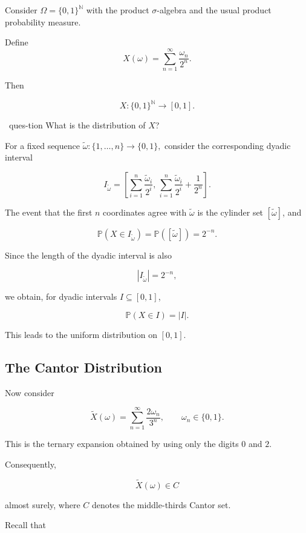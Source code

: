 Consider
\(
\Omega=\{0,1\}^{\mathbb{N}}
\)
with the product $\sigma$-algebra and the usual product probability
measure.

Define
\[
X(\omega)
=
\sum_{n=1}^{\infty}
\frac{\omega_n}{2^n}.
\]

Then

\[
X:\{0,1\}^{\mathbb{N}}\longrightarrow[0,1].
\]

\begin{question}{~}{ques-tion}
What is the distribution of $X$?
\end{question}

For a fixed sequence
\(
\widetilde{\omega}:
\{1,\ldots,n\}
\longrightarrow
\{0,1\},
\)
consider the corresponding dyadic interval

\[
I_{\widetilde{\omega}}
=
\left[
\sum_{i=1}^{n}
\frac{\widetilde{\omega}_i}{2^i},
\,
\sum_{i=1}^{n}
\frac{\widetilde{\omega}_i}{2^i}
+
\frac{1}{2^n}
\right].
\]

The event that the first $n$ coordinates agree with
$\widetilde{\omega}$ is the cylinder set
$[\widetilde{\omega}]$, and

\[
\mathbb{P}
\left(
X\in I_{\widetilde{\omega}}
\right)
=
\mathbb{P}
\left(
[\widetilde{\omega}]
\right)
=
2^{-n}.
\]

Since the length of the dyadic interval is also

\[
|I_{\widetilde{\omega}}|
=
2^{-n},
\]

we obtain, for dyadic intervals $I\subseteq[0,1]$,

\[
\mathbb{P}(X\in I)=|I|.
\]

This leads to the uniform distribution on $[0,1]$.

\subsection{The Cantor Distribution}

Now consider

\[
\widetilde{X}(\omega)
=
\sum_{n=1}^{\infty}
\frac{2\omega_n}{3^n},
\qquad
\omega_n\in\{0,1\}.
\]

This is the ternary expansion obtained by using only the digits $0$
and $2$.

Consequently,

\[
\widetilde{X}(\omega)
\in C
\]

almost surely, where $C$ denotes the middle-thirds Cantor set.

Recall that

